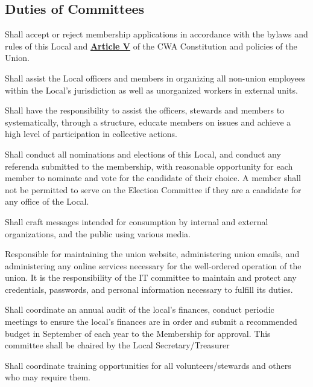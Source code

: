 \documentclass[11pt]{article}
\let\oldhref\href
\renewcommand{\href}[2]{\oldhref{#1}{\bfseries#2}}
\newcommand{\articlesection}[1]{\vspace{.25cm}\subsection{#1}}
\begin{document}
\articlesection{Duties of Committees}\label{duties-of-committees}
\begin{description}[labelwidth=\linewidth, listparindent=0pt]
\item[Membership Committee]
Shall accept or reject membership applications in accordance with the bylaws and rules of this Local and \href{https://cwa-union.org/for-locals/cwa-constitution\#A5}{Article V} of the CWA Constitution and policies of the Union.

\item[Organizing Committee]
Shall assist the Local officers and members in organizing all non-union employees within the Local's jurisdiction as well as unorganized workers in external units.
\item[Mobilization Committee]
Shall have the responsibility to assist the officers, stewards and members to systematically, through a structure, educate members on issues and achieve a high level of participation in collective actions.

\item[Election Committee]
Shall conduct all nominations and elections of this Local, and conduct any referenda submitted to the membership,  with reasonable opportunity for each member to nominate and vote for the candidate of their choice. A member shall not be permitted to serve on the Election Committee if they are a candidate for any office of the Local.

\item[Communications Committee]
  Shall craft messages intended for consumption by internal and external organizations, and the public using various media.

\item[IT Committee]
Responsible for maintaining the union website, administering union emails, and administering any online services necessary for the well-ordered operation of the union. It is the responsibility of the IT committee to maintain and protect any credentials, passwords, and personal information necessary to fulfill its duties.

\item[Finance Committee]

Shall coordinate an annual audit of the local’s finances, conduct periodic meetings to ensure the local’s finances are in order and submit a recommended budget in September of each year to the Membership for approval. This committee shall be chaired by the Local Secretary/Treasurer

\item[Education Committee]
Shall coordinate training opportunities for all volunteers/stewards and others who may require them.


\end{description}
\end{document}
